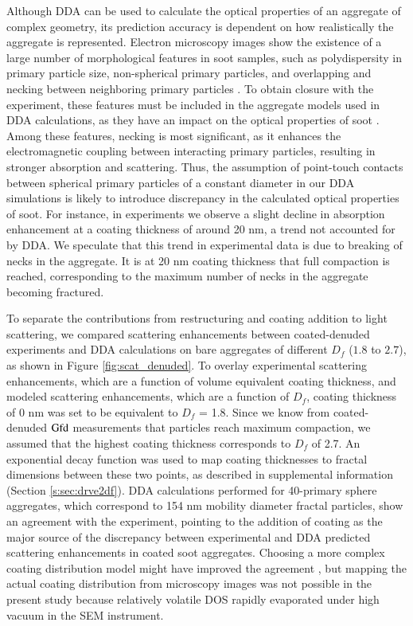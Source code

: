 \documentclass[12pt,authoryear]{elsarticle}
\begin{document}
Although DDA can be used to calculate the optical properties of an aggregate of complex geometry, its prediction accuracy is dependent on how realistically the aggregate is represented. Electron microscopy images show the existence of a large number of morphological features in soot samples, such as polydispersity in primary particle size, non-spherical primary particles, and overlapping and necking between neighboring primary particles \citep{RN24,RN28}. To obtain closure with the experiment, these features must be included in the aggregate models used in DDA calculations, as they have an impact on the optical properties of soot \citep{teng2019accounting}. Among these features, necking is most significant, as it enhances the electromagnetic coupling between interacting primary particles, resulting in stronger absorption and scattering. Thus, the assumption of point-touch contacts between spherical primary particles of a constant diameter in our DDA simulations is likely to introduce discrepancy in the calculated optical properties of soot. For instance, in experiments we observe a slight decline in absorption enhancement at a coating thickness of around 20 nm, a trend not accounted for by DDA. We speculate that this trend in experimental data is due to breaking of necks in the aggregate. It is at 20 nm coating thickness that full compaction is reached, corresponding to the maximum number of necks in the aggregate becoming fractured.

To separate the contributions from restructuring and coating addition to light scattering, we compared scattering enhancements between coated-denuded experiments and DDA calculations on bare aggregates of different $D_f$ ($1.8$ to $2.7$), as shown in Figure \ref{fig:scat_denuded}. To overlay experimental scattering enhancements, which are a function of volume equivalent coating thickness, and modeled scattering enhancements, which are a function of $D_f$, coating thickness of 0 nm was set to be equivalent to $D_f$ = 1.8. Since we know from coated-denuded $\rm Gfd$ measurements that particles reach maximum compaction, we assumed that the highest coating thickness corresponds to $D_f$ of 2.7. An exponential decay function was used to map coating thicknesses to fractal dimensions between these two points, as described in supplemental information (Section \ref{s:sec:drve2df}). DDA calculations performed for 40-primary sphere aggregates, which correspond to 154 nm mobility diameter fractal particles, show an agreement with the experiment, pointing to the addition of coating as the major source of the discrepancy between experimental and DDA predicted scattering enhancements in coated soot aggregates. Choosing a more complex coating distribution model might have improved the agreement \citep{luo2019optical}, but mapping the actual coating distribution from microscopy images was not possible in the present study because relatively volatile DOS rapidly evaporated under high vacuum in the SEM instrument.
\end{document}
